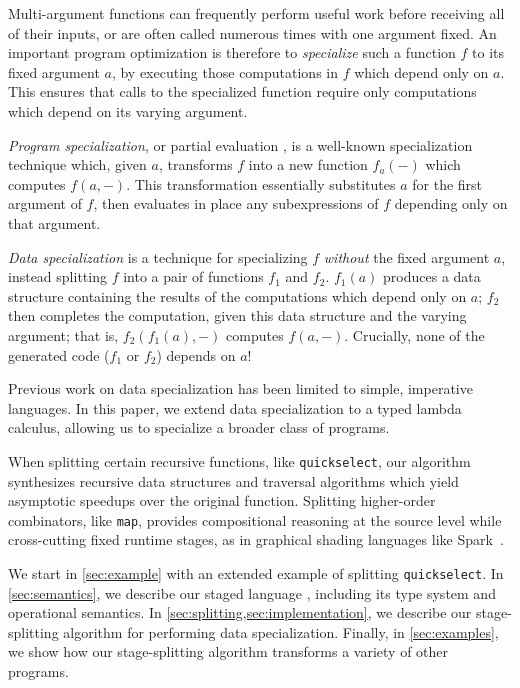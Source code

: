Multi-argument functions can frequently perform useful work before receiving all
of their inputs, or are often called numerous times with one argument fixed. An
important program optimization is therefore to \emph{specialize} such a function
$f$ to its fixed argument $a$, by executing those computations in $f$ which
depend only on $a$. This ensures that calls to the specialized function require
only computations which depend on its varying argument.

\emph{Program specialization}, or partial evaluation \cite{futamura71,jones96},
is a well-known specialization technique which, given $a$, transforms $f$ into a
new function $f_a(-)$ which computes $f(a,-)$. This transformation essentially
substitutes $a$ for the first argument of $f$, then evaluates in place any
subexpressions of $f$ depending only on that argument.

\emph{Data specialization} \cite{knoblock96,JS86-staging} 
is a technique for specializing $f$ \emph{without} the fixed argument $a$,
instead splitting $f$ into a pair of functions $f_1$ and $f_2$. $f_1(a)$
produces a data structure containing the results of the computations which
depend only on $a$; $f_2$ then completes the computation, given this data
structure and the varying argument; that is, $f_2(f_1(a),-)$ computes $f(a,-)$.
Crucially, none of the generated code ($f_1$ or $f_2$) depends on $a$!

Previous work on data specialization has been limited to simple, imperative
languages. In this paper, we extend data specialization to a typed lambda
calculus, allowing us to specialize a broader class of programs.

When splitting certain recursive functions, like \texttt{quickselect}, our
algorithm synthesizes recursive data structures and traversal algorithms which
yield asymptotic speedups over the original function. Splitting higher-order
combinators, like \texttt{map}, provides compositional reasoning at the source
level while cross-cutting fixed runtime stages, as in graphical shading
languages like Spark~\cite{Foley:2011}.

We start in \ref{sec:example} with an extended example of splitting
\texttt{quickselect}.
In \ref{sec:semantics}, we describe our staged language \lang, including its
type system and operational semantics.
In \ref{sec:splitting,sec:implementation}, we describe our stage-splitting
algorithm for performing data specialization.
Finally, in \ref{sec:examples}, we show how our stage-splitting algorithm
transforms a variety of other programs.
